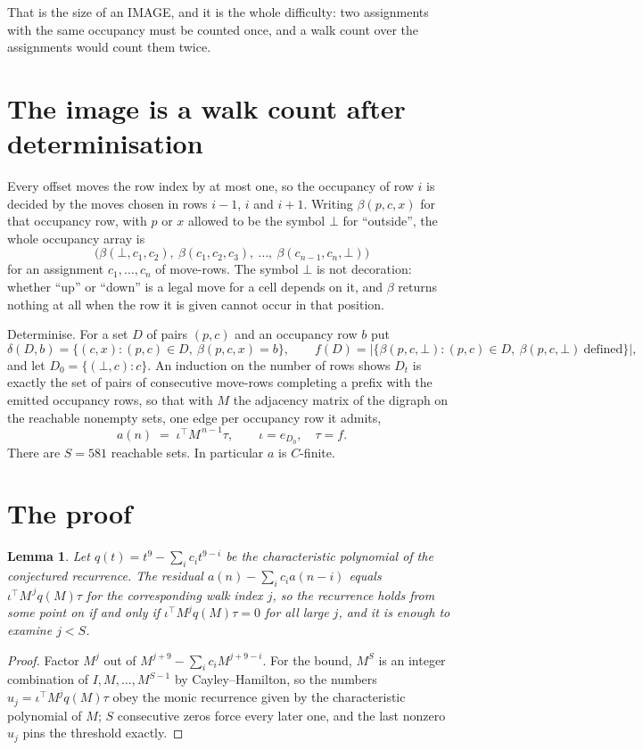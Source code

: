 \documentclass[11pt,a4paper]{article}
\theoremstyle{plain}
\newtheorem{lemma}[theorem]{Lemma}
\theoremstyle{definition}
\begin{document}
That is the size of an IMAGE, and it is the whole difficulty: two assignments with the same
occupancy must be counted once, and a walk count over the assignments would count them twice.

\section{The image is a walk count after determinisation}

Every offset moves the row index by at most one, so the occupancy of row $i$ is decided by the
moves chosen in rows $i-1$, $i$ and $i+1$. Writing $\beta(p,c,x)$ for that occupancy row, with
$p$ or $x$ allowed to be the symbol $\bot$ for ``outside'', the whole occupancy array is
\[
\bigl(\beta(\bot,c_1,c_2),\ \beta(c_1,c_2,c_3),\ \dots,\ \beta(c_{n-1},c_n,\bot)\bigr)
\]
for an assignment $c_1,\dots,c_n$ of move-rows. The symbol $\bot$ is not decoration: whether
``up'' or ``down'' is a legal move for a cell depends on it, and $\beta$ returns nothing at all
when the row it is given cannot occur in that position.

Determinise. For a set $D$ of pairs $(p,c)$ and an occupancy row $b$ put
\[
\delta(D,b)=\{(c,x):(p,c)\in D,\ \beta(p,c,x)=b\},\qquad
f(D)=\bigl|\{\beta(p,c,\bot):(p,c)\in D,\ \beta(p,c,\bot)\ \text{defined}\}\bigr| ,
\]
and let $D_0=\{(\bot,c):c\}$. An induction on the number of rows shows $D_t$ is exactly the
set of pairs of consecutive move-rows completing a prefix with the emitted occupancy rows, so
that with $M$ the adjacency matrix of the digraph on the reachable nonempty sets, one edge per
occupancy row it admits,
\[
a(n)\;=\;\iota^{\!\top}M^{\,n-1}\tau,\qquad \iota=e_{D_0},\quad \tau=f .
\]
There are $S=581$ reachable sets. In particular $a$ is $C$-finite.

\section{The proof}

\begin{lemma}\label{lem:crit}
Let $q(t)=t^{9}-\sum_i c_it^{9-i}$ be the characteristic polynomial of the
conjectured recurrence. The residual $a(n)-\sum_ic_ia(n-i)$ equals
$\iota^{\!\top}M^{\,j}q(M)\tau$ for the corresponding walk index $j$, so the recurrence
holds from some point on if and only if $\iota^{\!\top}M^{j}q(M)\tau=0$ for all large $j$,
and it is enough to examine $j<S$.
\end{lemma}

\begin{proof}
Factor $M^{j}$ out of $M^{j+9}-\sum_ic_iM^{j+9-i}$. For the bound, $M^{S}$
is an integer combination of $I,M,\dots,M^{S-1}$ by Cayley--Hamilton, so the numbers
$u_j=\iota^{\!\top}M^{j}q(M)\tau$ obey the monic recurrence given by the characteristic
polynomial of $M$; $S$ consecutive zeros force every later one, and the last nonzero $u_j$
pins the threshold exactly.
\end{proof}
\end{document}
